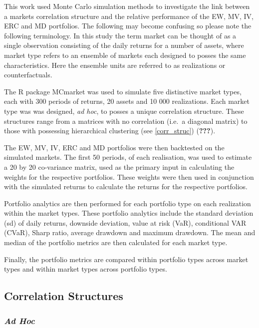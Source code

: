 \documentclass[11pt,preprint, authoryear]{elsarticle}
\numberwithin{equation}{section}
\numberwithin{figure}{section}
\numberwithin{table}{section}
\begin{document}
This work used Monte Carlo simulation methods to investigate the link
between a markets correlation structure and the relative performance of
the EW, MV, IV, ERC and MD portfolios. The following may become
confusing so please note the following terminology. In this study the
term market can be thought of as a single observation consisting of the
daily returns for a number of assets, where market type refers to an
ensemble of markets each designed to posses the same characteristics.
Here the ensemble units are referred to as realizations or
counterfactuals.

The R package MCmarket was used to simulate five distinctive market
types, each with 300 periods of returns, 20 assets and 10 000
realizations. Each market type was was designed, \emph{ad hoc}, to
posses a unique correlation structure. These structures range from a
matrices with no correlation (i.e.~a diagonal matrix) to those with
possessing hierarchical clustering (see \ref{corr_struc})
({\textbf{???}}).

The EW, MV, IV, ERC and MD portfolios were then backtested on the
simulated markets. The first 50 periods, of each realisation, was used
to estimate a 20 by 20 co-variance matrix, used as the primary input in
calculating the weights for the respective portfolios. These weights
were then used in conjunction with the simulated returns to calculate
the returns for the respective portfolios.

Portfolio analytics are then performed for each portfolio type on each
realization within the market types. These portfolio analytics include
the standard deviation (sd) of daily returns, downside deviation, value
at risk (VaR), conditional VAR (CVaR), Sharp ratio, average drawdown and
maximum drawdown. The mean and median of the portfolio metrics are then
calculated for each market type.

Finally, the portfolio metrics are compared within portfolio types
across market types and within market types across portfolio types.

\hypertarget{correlation-structures}{%
\subsection{\texorpdfstring{Correlation Structures
\label{corr_struc}}{Correlation Structures }}\label{correlation-structures}}

\hypertarget{ad-hoc}{%
\subsubsection{\texorpdfstring{\emph{Ad Hoc}}{Ad Hoc}}\label{ad-hoc}}
\end{document}

